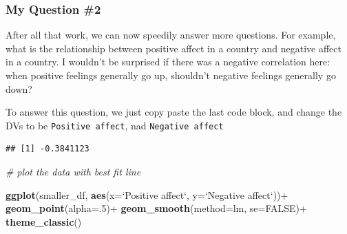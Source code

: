 \documentclass[]{book}
\newenvironment{Shaded}{\begin{snugshade}}{\end{snugshade}}
\newcommand{\KeywordTok}[1]{\textcolor[rgb]{0.13,0.29,0.53}{\textbf{{#1}}}}
\newcommand{\DataTypeTok}[1]{\textcolor[rgb]{0.13,0.29,0.53}{{#1}}}
\newcommand{\DecValTok}[1]{\textcolor[rgb]{0.00,0.00,0.81}{{#1}}}
\newcommand{\StringTok}[1]{\textcolor[rgb]{0.31,0.60,0.02}{{#1}}}
\newcommand{\CommentTok}[1]{\textcolor[rgb]{0.56,0.35,0.01}{\textit{{#1}}}}
\newcommand{\OtherTok}[1]{\textcolor[rgb]{0.56,0.35,0.01}{{#1}}}
\newcommand{\NormalTok}[1]{{#1}}
\theoremstyle{definition}
\theoremstyle{definition}
\theoremstyle{definition}
\theoremstyle{remark}
\begin{document}
\subsubsection{My Question \#2}\label{my-question-2}

After all that work, we can now speedily answer more questions. For
example, what is the relationship between positive affect in a country
and negative affect in a country. I wouldn't be surprised if there was a
negative correlation here: when positive feelings generally go up,
shouldn't negative feelings generally go down?

To answer this question, we just copy paste the last code block, and
change the DVs to be \texttt{Positive\ affect}, nad
\texttt{Negative\ affect}

\begin{Shaded}
\end{Shaded}

\begin{verbatim}
## [1] -0.3841123
\end{verbatim}

\begin{Shaded}
\begin{Highlighting}[]
\CommentTok{# plot the data with best fit line}

\KeywordTok{ggplot}\NormalTok{(smaller_df, }\KeywordTok{aes}\NormalTok{(}\DataTypeTok{x=}\StringTok{`}\DataTypeTok{Positive affect}\StringTok{`}\NormalTok{,}
                     \DataTypeTok{y=}\StringTok{`}\DataTypeTok{Negative affect}\StringTok{`}\NormalTok{))+}
\StringTok{  }\KeywordTok{geom_point}\NormalTok{(}\DataTypeTok{alpha=}\NormalTok{.}\DecValTok{5}\NormalTok{)+}
\StringTok{  }\KeywordTok{geom_smooth}\NormalTok{(}\DataTypeTok{method=}\NormalTok{lm, }\DataTypeTok{se=}\OtherTok{FALSE}\NormalTok{)+}
\StringTok{  }\KeywordTok{theme_classic}\NormalTok{()}
\end{Highlighting}
\end{Shaded}
\end{document}
